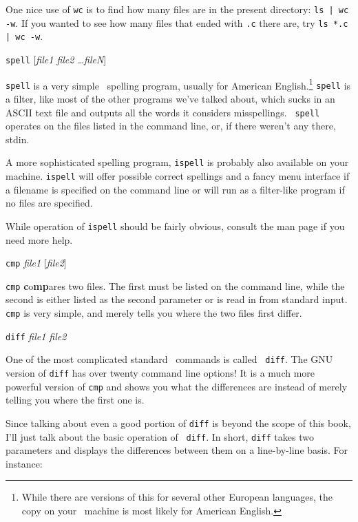 One nice use of {\tt wc} is to find how many files are in the present
directory: {\tt ls | wc -w}. If you wanted to see how many files that
ended with {\tt .c} there are, try {\tt ls *.c | wc -w}.

\begin{command}
  {\tt spell} [{\sl file1 file2 \ldots fileN\/}]
\end{command}

{\tt spell} is a very simple \unix\ spelling program, usually for
American English.\footnote{While there are versions of this for
  several other European languages, the copy on your \linux\ machine
  is most likely for American English.} {\tt spell} is a filter, like
most of the other programs we've talked about, which sucks in an ASCII
text file and outputs all the words it considers misspellings.  {\tt
  spell} operates on the files listed in the command line, or, if
there weren't any there, stdin.

A more sophisticated spelling program, {\tt ispell} is
probably also available on your machine.  {\tt ispell} will offer
possible correct spellings and a fancy menu interface if a filename is
specified on the command line or will run as a filter-like program if
no files are specified.

While operation of {\tt ispell} should be fairly
obvious, consult the man page if you need more help.

\begin{command}
  {\tt cmp} {\sl file1} [{\sl file2\/}]
\end{command}

{\tt cmp} {\bf c}o{\bf mp}ares two files. The first must be listed on
the command line, while the second is either listed as the second
parameter or is read in from standard input. {\tt cmp} is very simple,
and merely tells you where the two files first differ.

\begin{command}
  {\tt diff} {\sl file1 file2}
\end{command}

One of the most complicated standard \unix\ commands is called {\tt
  diff}. The GNU version of {\tt diff} has over
twenty command line options! It is a much more powerful version of
{\tt cmp} and shows you what the differences are instead of merely
telling you where the first one is.

Since talking about even a good portion of {\tt diff} is beyond the
scope of this book, I'll just talk about the basic operation of {\tt
  diff}.  In short, {\tt diff} takes two parameters and displays the
differences between them on a line-by-line basis. For instance:

